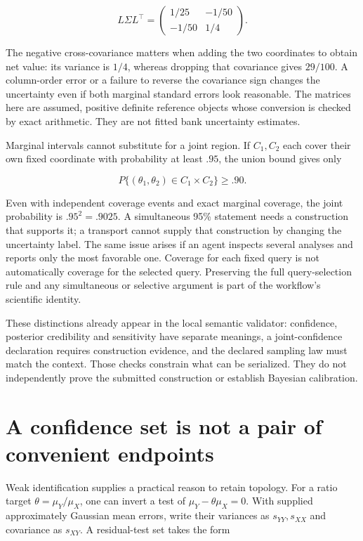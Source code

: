 \[
 L\Sigma L^\top=
 \begin{pmatrix}1/25&-1/50\\-1/50&1/4\end{pmatrix}.
\]

The negative cross-covariance matters when adding the two coordinates to
obtain net value: its variance is \(1/4\), whereas dropping that
covariance gives \(29/100\). A column-order error or a failure to
reverse the covariance sign changes the uncertainty even if both
marginal standard errors look reasonable. The matrices here are assumed,
positive definite reference objects whose conversion is checked by exact
arithmetic. They are not fitted bank uncertainty estimates.
\citep{exec13_interchange_examples}

Marginal intervals cannot substitute for a joint region. If \(C_1,C_2\)
each cover their own fixed coordinate with probability at least \(.95\),
the union bound gives only

\[
 P\{(\theta_1,\theta_2)\in C_1\times C_2\}\geq .90.
\]

Even with independent coverage events and exact marginal coverage, the
joint probability is \(.95^2=.9025\). A simultaneous 95\% statement
needs a construction that supports it; a transport cannot supply that
construction by changing the uncertainty label. The same issue arises if
an agent inspects several analyses and reports only the most favorable
one. Coverage for each fixed query is not automatically coverage for the
selected query. Preserving the full query-selection rule and any
simultaneous or selective argument is part of the workflow's scientific
identity.

These distinctions already appear in the local semantic validator:
confidence, posterior credibility and sensitivity have separate
meanings, a joint-confidence declaration requires construction evidence,
and the declared sampling law must match the context. Those checks
constrain what can be serialized. They do not independently prove the
submitted construction or establish Bayesian calibration.
\citep{exec13_interchange_runtime}

\hypertarget{a-confidence-set-is-not-a-pair-of-convenient-endpoints}{%
\section{A confidence set is not a pair of convenient
endpoints}\label{a-confidence-set-is-not-a-pair-of-convenient-endpoints}}

Weak identification supplies a practical reason to retain topology. For
a ratio target \(\theta=\mu_Y/\mu_X\), one can invert a test of
\(\mu_Y-\theta\mu_X=0\). With supplied approximately Gaussian mean
errors, write their variances as \(s_{YY},s_{XX}\) and covariance as
\(s_{XY}\). A residual-test set takes the form

